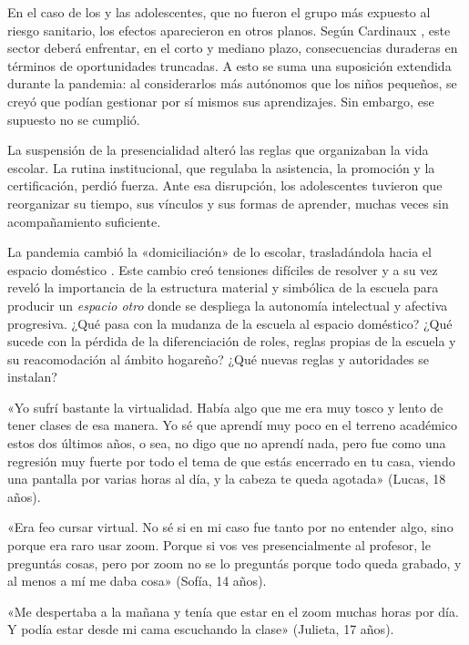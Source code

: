 \begin{refsection}
En el caso de los y las adolescentes, que no fueron el grupo más expuesto al riesgo sanitario, los efectos aparecieron en otros planos. Según Cardinaux \protect\parencite*{4191-CARDINAUX2020}, este sector deberá enfrentar, en el corto y mediano plazo, consecuencias duraderas en términos de oportunidades truncadas. A esto se suma una suposición extendida durante la pandemia: al considerarlos más autónomos que los niños pequeños, se creyó que podían gestionar por sí mismos sus aprendizajes. Sin embargo, ese supuesto no se cumplió.

La suspensión de la presencialidad alteró las reglas que organizaban la vida escolar. La rutina institucional, que regulaba la asistencia, la promoción y la certificación, perdió fuerza. Ante esa disrupción, los adolescentes tuvieron que reorganizar su tiempo, sus vínculos y sus formas de aprender, muchas veces sin acompañamiento suficiente.

La pandemia cambió la «domiciliación» de lo escolar, trasladándola hacia el espacio doméstico \protect\parencite{4197-DUSSEL2020}. Este cambio creó tensiones difíciles de resolver y a su vez reveló la importancia de la estructura material y simbólica de la escuela para producir un \emph{espacio otro} donde se despliega la autonomía intelectual y afectiva progresiva. ¿Qué pasa con la mudanza de la escuela al espacio doméstico? ¿Qué sucede con la pérdida de la diferenciación de roles, reglas propias de la escuela y su reacomodación al ámbito hogareño? ¿Qué nuevas reglas y autoridades se instalan?


\begin{gbcita}
«Yo sufrí bastante la virtualidad. Había algo que me era muy tosco y lento de tener clases de esa manera. Yo sé que aprendí muy poco en el terreno académico estos dos últimos años, o sea, no digo que no aprendí nada, pero fue como una regresión muy fuerte por todo el tema de que estás encerrado en tu casa, viendo una pantalla por varias horas al día, y la cabeza te queda agotada» (Lucas, 18 años).

«Era feo cursar virtual. No sé si en mi caso fue tanto por no entender algo, sino porque era raro usar zoom. Porque si vos ves presencialmente al profesor, le preguntás cosas, pero por zoom no se lo preguntás porque todo queda grabado, y al menos a mí me daba cosa» (Sofía, 14 años).

«Me despertaba a la mañana y tenía que estar en el zoom muchas horas por día. Y podía estar desde mi cama escuchando la clase» (Julieta, 17 años).


\end{gbcita}
\end{refsection}
